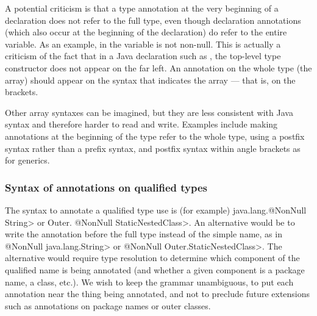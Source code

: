 \documentclass[10pt]{article}
\begin{document}
A potential criticism is that a type annotation at the very beginning of a
declaration does not refer to the full type, even though declaration
annotations (which also occur at the beginning of
the declaration) do refer to the entire variable.  As an example, in
 the variable  is not non-null.
This is actually a criticism of the fact that in a Java declaration such as
, the top-level type constructor does not appear on
the far left.
An annotation on the whole type (the array) should
appear on the syntax that indicates the array --- that is, on the brackets.


Other array syntaxes can be imagined, but they are less consistent with
Java syntax and therefore harder to read and write.
Examples include
making annotations at the beginning of the type refer to the whole type,
using a postfix syntax rather than a prefix syntax, and postfix syntax
within angle brackets as for generics.






\subsubsection{Syntax of annotations on qualified types\label{qualified-type-syntax}}

The syntax to annotate a qualified type use is (for example) 
\<java.lang.@NonNull String> or \<Outer. @NonNull StaticNestedClass>.
An alternative would be to write the annotation before the full type
instead of the simple name, as in \<@NonNull java.lang.String> or
\<@NonNull Outer.StaticNestedClass>.  The alternative would require type
resolution to determine which component of the qualified name is being
annotated (and whether a given component is a package name, a class, etc.).
We wish to keep the grammar unambiguous, to put each annotation near the
thing being annotated, and not to preclude future extensions such as
annotations on package names or outer classes.
\end{document}
